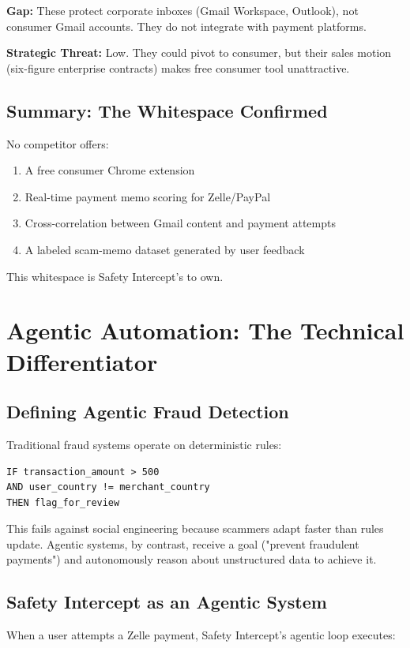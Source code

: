 \documentclass[12pt]{article}
\begin{document}
\textbf{Gap:} These protect corporate inboxes (Gmail Workspace, Outlook), not consumer Gmail accounts. They do not integrate with payment platforms.

\textbf{Strategic Threat:} Low. They could pivot to consumer, but their sales motion (six-figure enterprise contracts) makes free consumer tool unattractive.

\subsection{Summary: The Whitespace Confirmed}
No competitor offers:
\begin{enumerate}
    \item A free consumer Chrome extension
    \item Real-time payment memo scoring for Zelle/PayPal
    \item Cross-correlation between Gmail content and payment attempts
    \item A labeled scam-memo dataset generated by user feedback
\end{enumerate}
This whitespace is Safety Intercept's to own.

\newpage
\section{Agentic Automation: The Technical Differentiator}

\subsection{Defining Agentic Fraud Detection}

Traditional fraud systems operate on deterministic rules:

\begin{verbatim}
IF transaction_amount > 500 
AND user_country != merchant_country 
THEN flag_for_review
\end{verbatim}

This fails against social engineering because scammers adapt faster than rules update. Agentic systems, by contrast, receive a goal ("prevent fraudulent payments") and autonomously reason about unstructured data to achieve it.

\subsection{Safety Intercept as an Agentic System}

When a user attempts a Zelle payment, Safety Intercept's agentic loop executes:
\end{document}
